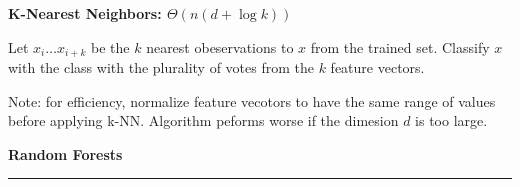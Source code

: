 \documentclass[landscape]{article}
\begin{document}
\begin{multicols}{3}
\textbf{K-Nearest Neighbors: $\Theta(n(d + \log k))$}

Let $x_i \ldots x_{i+k}$ be the $k$ nearest obeservations to $x$ from the trained set. Classify $x$ with the class with the plurality of votes from the $k$ feature vectors.

Note: for efficiency, normalize feature vecotors to have the same range of values before applying k-NN. Algorithm peforms worse if the dimesion $d$ is too large.

\textbf{Random Forests}








\rule{0.3\linewidth}{0.25pt}
\newpage
\scriptsize


\end{multicols}
\end{document}
